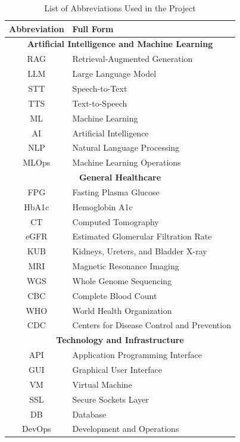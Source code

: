 \documentclass[12pt,a4paper]{report}
\begin{document}
\begin{table}[ht]
\centering
\begin{tabular}{|c|l|}
\hline
\textbf{Abbreviation} & \textbf{Full Form} \\ \hline

\multicolumn{2}{|c|}{\textbf{Artificial Intelligence and Machine Learning}} \\ \hline
RAG & Retrieval-Augmented Generation \\ \hline
LLM & Large Language Model \\ \hline
STT & Speech-to-Text \\ \hline
TTS & Text-to-Speech \\ \hline
ML & Machine Learning \\ \hline
AI & Artificial Intelligence \\ \hline
NLP & Natural Language Processing \\ \hline
MLOps & Machine Learning Operations \\ \hline

\multicolumn{2}{|c|}{\textbf{General Healthcare}} \\ \hline
FPG & Fasting Plasma Glucose \\ \hline
HbA1c & Hemoglobin A1c \\ \hline
CT & Computed Tomography \\ \hline
eGFR & Estimated Glomerular Filtration Rate \\ \hline
KUB & Kidneys, Ureters, and Bladder X-ray \\ \hline
MRI & Magnetic Resonance Imaging \\ \hline
WGS & Whole Genome Sequencing \\ \hline
CBC & Complete Blood Count \\ \hline
WHO & World Health Organization \\ \hline
CDC & Centers for Disease Control and Prevention \\ \hline


\multicolumn{2}{|c|}{\textbf{Technology and Infrastructure}} \\ \hline
API & Application Programming Interface \\ \hline
GUI & Graphical User Interface \\ \hline
VM & Virtual Machine \\ \hline
SSL & Secure Sockets Layer \\ \hline
DB & Database \\ \hline
DevOps & Development and Operations \\ \hline

\end{tabular}
\caption{List of Abbreviations Used in the Project}
\label{tab:abbreviations}
\end{table}
\end{document}
